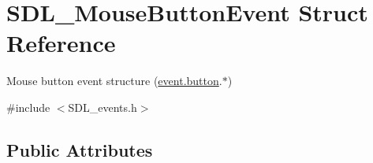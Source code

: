 \hypertarget{struct_s_d_l___mouse_button_event}{}\section{S\+D\+L\+\_\+\+Mouse\+Button\+Event Struct Reference}
\label{struct_s_d_l___mouse_button_event}


Mouse button event structure (\hyperlink{union_s_d_l___event_ab6da2fa2687e5f849f270adecc64785f}{event.\+button}.$\ast$)  




{\ttfamily \#include $<$S\+D\+L\+\_\+events.\+h$>$}

\subsection*{Public Attributes}
